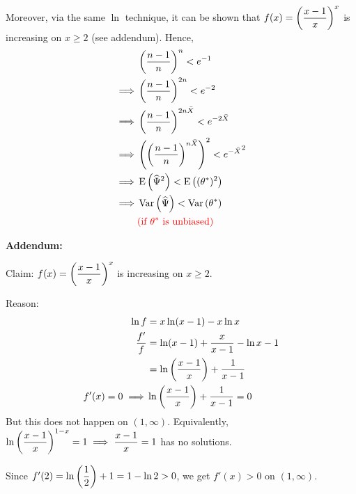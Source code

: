 \begin{enumerate}[label=\textcircled{\raisebox{-1pt}{\arabic*}}]
            \nl Moreover, via the same $\ln$ technique, it can be shown that $f(x) = \pfrac*{x-1}{x}^x$ is increasing on $x \geq 2$ (see addendum). Hence,
            \begin{align*}
                & \pfrac{n-1}{n}^n < e^{-1}\\
                \implies & \pfrac{n-1}{n}^{2n} < e^{-2}\\
                \implies & \pfrac{n-1}{n}^{2n\Xbar} < e^{-2\Xbar}\\
                \implies & \pars{\pfrac{n-1}{n}^{n\Xbar}}^2 < {e^{-\Xbar}}^2\\
                \implies & \E{\Psihat^2} < \E{(\theta^*)^2}\\
                \implies & \Var{\Psihat} < \Var{\theta^*}\\
                & \red{\text{(if } \theta^* \text{ is unbiased)}}
            \end{align*}

            \newpage\noindent \textbf{Addendum:}
            
            \nl Claim: $f(x) = \displaystyle \pfrac*{x-1}{x}^x$ is increasing on $x \geq 2$.

            \nl Reason:
            \begin{align*}
                \ln f &= x \ln (x-1) - x \ln x\\
                \frac{f'}{f} &= \ln (x-1) + \frac{x}{x-1} - \ln x - 1\\
                &= \ln \pfrac{x-1}{x} + \over{x-1}\\
                f'(x) = 0 \implies& \ln \pfrac{x-1}{x} + \over{x-1} = 0
            \end{align*}
            But this does not happen on $(1, \infty)$. Equivalently, $\displaystyle \ln \pfrac*{x-1}{x}^{1-x} = 1 \implies \dfrac{x-1}{x} = 1$ has no solutions.

            \nl Since $f'(2) = \ln \pfrac*{1}{2} + 1 = 1 - \ln 2 > 0$, we get $f'(x) > 0$ on $(1, \infty)$.
            
\end{enumerate}